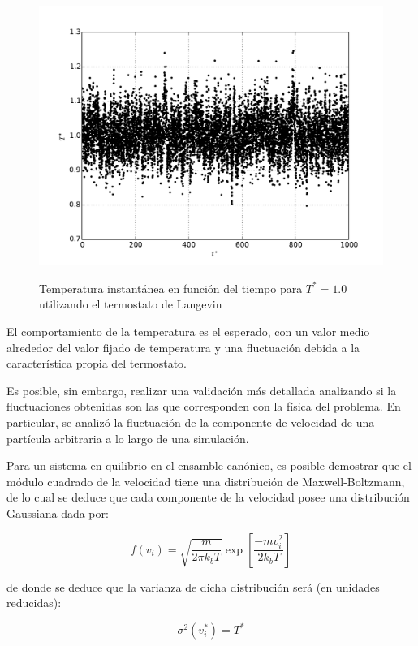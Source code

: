 \documentclass[a4paper,12pt]{article}
\begin{document}
\begin{figure}[H]
	\centering
	\includegraphics[scale=0.5]{termo_tempe.pdf} \\
	\caption{Temperatura instantánea en función del tiempo para $T^*=1.0$ 
	utilizando el termostato de Langevin}\label{fig:termo_tempe}
\end{figure}

El comportamiento de la temperatura es el esperado, con un valor medio 
alrededor del valor fijado de temperatura y una fluctuación debida a la 
característica propia del termostato.

Es posible, sin embargo, realizar una validación más detallada analizando si la 
fluctuaciones obtenidas son las que corresponden con la física del problema. En 
particular, se analizó la fluctuación de la componente de velocidad de una 
partícula arbitraria a lo largo de una simulación.

Para un sistema en quilibrio en el ensamble canónico, es posible demostrar que 
el módulo cuadrado de la velocidad tiene una distribución de Maxwell-Boltzmann, 
de lo cual se deduce que cada componente de la velocidad posee una distribución 
Gaussiana dada por:

\begin{equation}\label{eq:dist_gauss}
f (v_i) =
\sqrt{\frac{m}{2 \pi k_bT}} \exp \left[ \frac{-mv_i^2}{2k_bT} \right]
\end{equation}

\noindent de donde se deduce que la varianza de dicha distribución será (en unidades reducidas):

\begin{equation}\label{eq:termo_sigma}
\sigma^2(v^*_i) = T^*
\end{equation}
\end{document}
